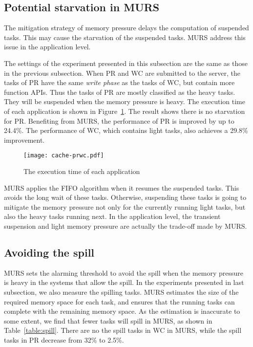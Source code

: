 \subsection{Potential starvation in MURS}

The mitigation strategy of memory pressure delays the computation of suspended tasks. This may cause the starvation of the suspended tasks. MURS address this issue in the application level. 

The settings of the experiment presented in this subsection are the same as those in the previous subsection. When PR and WC are submitted to the server, the tasks of PR have the same \textit{write phase} as the tasks of WC, but contain more function APIs. Thus the tasks of PR are mostly classified as the heavy tasks. They will be suspended when the memory pressure is heavy. The execution time of each application is shown in Figure~\ref{fig:cache-prwc}. The result shows there is no starvation for PR. Benefiting from MURS, the performance of PR is improved by up to 24.4\%. The performance of WC, which contains light tasks, also achieves a 29.8\% improvement. 

\begin{figure}[!t]
\centering
\texttt{[image: cache-prwc.pdf]}
\caption{The execution time of each application}
\label{fig:cache-prwc}
\end{figure}

MURS applies the FIFO algorithm when it resumes the suspended tasks. This avoids the long wait of these tasks. Otherwise, suspending these tasks is going to mitigate the memory pressure not only for the currently running light tasks, but also the heavy tasks running next. In the application level, the transient suspension and light memory pressure are actually the trade-off made by MURS. 

\subsection{Avoiding the spill}

MURS sets the alarming threshold to avoid the spill when the memory pressure is heavy in the systems that allow the spill. In the experiments presented in last subsection, we also measure the spilling tasks. MURS estimates the size of the required memory space for each task, and ensures that the running tasks can complete with the remaining memory space. As the estimation is inaccurate to some extent, we find that fewer tasks will spill in MURS, as shown in Table~\ref{table:spill}. There are no the spill tasks in WC in MURS, while the spill tasks in PR decrease from 32\% to 2.5\%.

